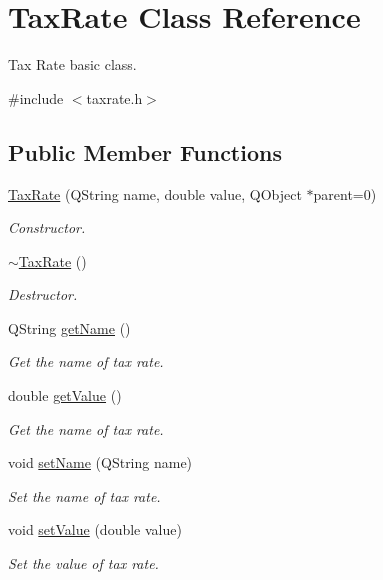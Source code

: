 \hypertarget{class_tax_rate}{\section{\-Tax\-Rate \-Class \-Reference}
\label{class_tax_rate}
}


\-Tax \-Rate basic class.  




{\ttfamily \#include $<$taxrate.\-h$>$}

\subsection*{\-Public \-Member \-Functions}
\begin{DoxyCompactItemize}
\item 
\hyperlink{class_tax_rate_ab781c83ae0f9bb140666e33caa0733c1}{\-Tax\-Rate} (\-Q\-String name, double value, \-Q\-Object $\ast$parent=0)
\begin{DoxyCompactList}\small\item\em \-Constructor. \end{DoxyCompactList}\item 
\hyperlink{class_tax_rate_ab8c001cd4e98efe446d93cb538cf8e71}{$\sim$\-Tax\-Rate} ()
\begin{DoxyCompactList}\small\item\em \-Destructor. \end{DoxyCompactList}\item 
\-Q\-String \hyperlink{class_tax_rate_a538cb01b20d6e164de6d157a2cd250d4}{get\-Name} ()
\begin{DoxyCompactList}\small\item\em \-Get the name of tax rate. \end{DoxyCompactList}\item 
double \hyperlink{class_tax_rate_ae3508b40949d91899de6578505ea499f}{get\-Value} ()
\begin{DoxyCompactList}\small\item\em \-Get the name of tax rate. \end{DoxyCompactList}\item 
void \hyperlink{class_tax_rate_ad2871e266cbdf95e8459121bb209f8d3}{set\-Name} (\-Q\-String name)
\begin{DoxyCompactList}\small\item\em \-Set the name of tax rate. \end{DoxyCompactList}\item 
void \hyperlink{class_tax_rate_a04fa0b6b74d514bba108fb2305136204}{set\-Value} (double value)
\begin{DoxyCompactList}\small\item\em \-Set the value of tax rate. \end{DoxyCompactList}\end{DoxyCompactItemize}


